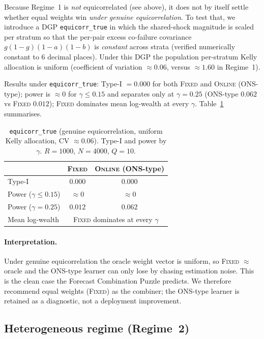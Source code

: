 \documentclass[11pt]{article}
\begin{document}
Because Regime~1 is \emph{not} equicorrelated (see above), it does not by itself
settle whether equal weights win \emph{under genuine equicorrelation}. To test that,
we introduce a DGP \texttt{equicorr\_true} in which the shared-shock magnitude is
scaled per stratum so that the per-pair excess co-failure covariance
$g(1-g)(1-a)(1-b)$ is \emph{constant} across strata (verified numerically constant to
$6$ decimal places). Under this DGP the population per-stratum Kelly allocation is
uniform (coefficient of variation $\approx 0.06$, versus $\approx 1.60$ in Regime~1).

Results under \texttt{equicorr\_true}: Type-I $=0.000$ for both \textsc{Fixed} and
\textsc{Online} (ONS-type); power is $\approx 0$ for $\gamma\le 0.15$ and separates
only at $\gamma=0.25$ (ONS-type $0.062$ vs \textsc{Fixed} $0.012$); \textsc{Fixed}
dominates mean log-wealth at every $\gamma$. Table~\ref{tab:eqtrue} summarises.

\begin{table}[h]
\centering
\caption{\texttt{equicorr\_true} (genuine equicorrelation, uniform Kelly allocation,
CV $\approx 0.06$). Type-I and power by $\gamma$. $R=1000$, $N=4000$, $Q=10$.}
\label{tab:eqtrue}
\begin{tabular}{lcc}
\toprule
 & \textsc{Fixed} & \textsc{Online} (ONS-type)\\
\midrule
Type-I                & $0.000$ & $0.000$\\
Power ($\gamma\le 0.15$) & $\approx 0$ & $\approx 0$\\
Power ($\gamma=0.25$)    & $0.012$ & $0.062$\\
Mean log-wealth          & \multicolumn{2}{c}{\textsc{Fixed} dominates at every $\gamma$}\\
\bottomrule
\end{tabular}
\end{table}

\paragraph{Interpretation.}
Under genuine equicorrelation the oracle weight vector is uniform, so \textsc{Fixed}
$\approx$ oracle and the ONS-type learner can only lose by chasing estimation noise.
This is the clean case the Forecast Combination Puzzle predicts. We therefore
recommend equal weights (\textsc{Fixed}) as the combiner; the ONS-type learner is
retained as a diagnostic, not a deployment improvement.

\subsection{Heterogeneous regime (Regime~2)}
\end{document}
